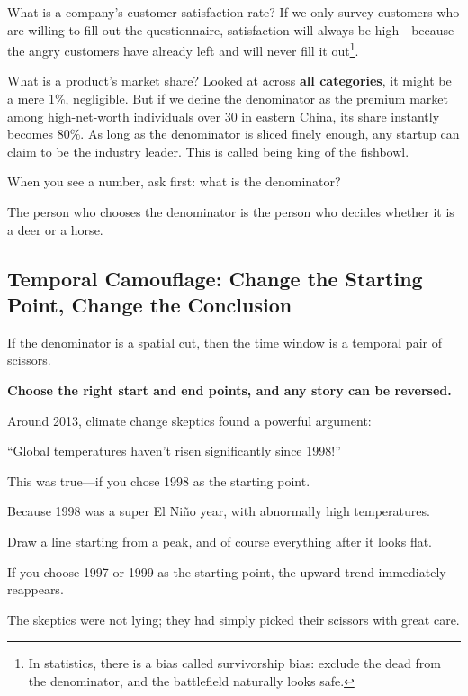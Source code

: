 What is a company's customer satisfaction rate? If we only survey customers who are willing to fill out the questionnaire, satisfaction will always be high---because the angry customers have already left and will never fill it out\footnote{In statistics, there is a bias called survivorship bias: exclude the dead from the denominator, and the battlefield naturally looks safe.}.

What is a product's market share? Looked at across \textbf{all categories}, it might be a mere 1\%, negligible. But if we define the denominator as the premium market among high-net-worth individuals over 30 in eastern China, its share instantly becomes 80\%. As long as the denominator is sliced finely enough, any startup can claim to be the industry leader. This is called being king of the fishbowl.

\vspace{1em}


When you see a number, ask first: what is the denominator?

The person who chooses the denominator is the person who decides whether it is a deer or a horse.


\subsection{Temporal Camouflage: Change the Starting Point, Change the Conclusion}

If the denominator is a spatial cut, then the time window is a temporal pair of scissors.

\textbf{Choose the right start and end points, and any story can be reversed.}

\vspace{1em}

Around 2013, climate change skeptics found a powerful argument:

``Global temperatures haven't risen significantly since 1998!''

This was true---if you chose 1998 as the starting point.

Because 1998 was a super El Ni\~no year, with abnormally high temperatures.

Draw a line starting from a peak, and of course everything after it looks flat.

If you choose 1997 or 1999 as the starting point, the upward trend immediately reappears.

The skeptics were not lying; they had simply picked their scissors with great care.

